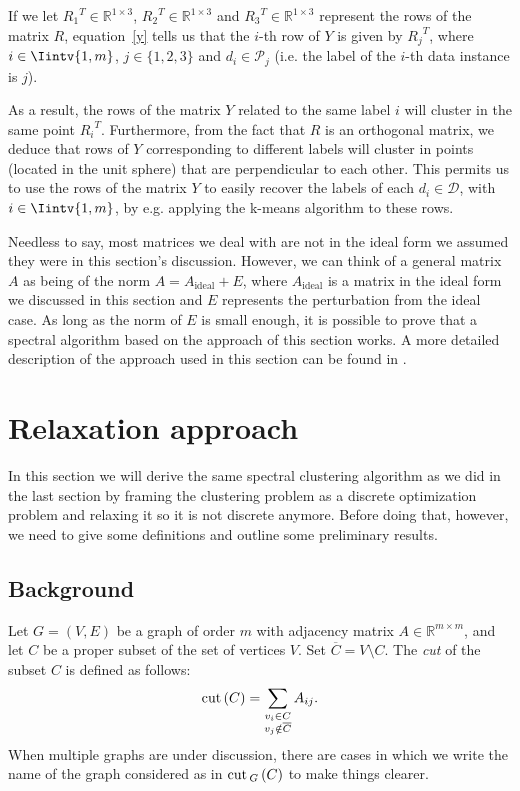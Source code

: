 If we let ${R_1}^T \in \mathbb{R}^{1 \times 3}$, ${R_2}^T \in \mathbb{R}^{1 \times 3}$ and ${R_3}^T \in \mathbb{R}^{1 \times 3}$ represent the rows of the matrix $R$, equation~\vref{y} tells us that the $i$-th row of $Y$ is given by ${R_j} ^T$, where $i \in \Iintv{1,m}$, $j \in \{1, 2, 3 \}$ and $d_i \in \mathcal P_j$ (i.e. the label of the $i$-th data instance is $j$).

As a result, the rows of the matrix $Y$ related to the same label $i$ will cluster in the same point ${R_i}^T$.
Furthermore, from the fact that $R$ is an orthogonal matrix, we deduce that rows of $Y$ corresponding to different labels will cluster in points (located in the unit sphere) that are perpendicular to each other. 
This permits us to use the rows of the matrix $Y$ to easily recover the labels of each $d_i \in \mathcal D$, with $i \in \Iintv{1,m}$, by e.g. applying the k-means algorithm to these rows.

Needless to say, most matrices we deal with are not in the ideal form we assumed they were in this section's discussion.
However, we can think of a general matrix $A$ as being of the norm $A = A_{\text{ideal}} + E$, where $A_{\text{ideal}}$ is a matrix in the ideal form we discussed in this section and $E$ represents the perturbation from the ideal case.
As long as the norm of $E$ is small enough, it is possible to prove that a spectral algorithm based on the approach of this section works.
A more detailed description of the approach used in this section can be found in \cite{ng}.


\section{Relaxation approach}
In this section we will derive the same spectral clustering algorithm as we did in the last section by framing the clustering problem as a discrete optimization problem and relaxing it so it is not discrete anymore.
Before doing that, however, we need to give some definitions and outline some preliminary results.

\subsection{Background}

\begin{definition}
   Let $G = (V,E)$ be a graph of order $m$ with adjacency matrix $A \in \mathbb R^{m \times m}$, and let $C$ be a proper subset of the set of vertices $V$. 
   Set $\overline{C} = V \setminus C$.
   The \textit{cut} of the subset $C$ is defined as follows:
   \begin{equation}
      \operatorname{cut\,} (C) = \sum_{\substack{v_i \in C \\ v_j \notin \overline C }} A_{ij}.
   \end{equation}
   When multiple graphs are under discussion, there are cases in which we write the name of the graph considered as in $\operatorname{cut\,} _G \,(C)$ to make things clearer.
\end{definition}

